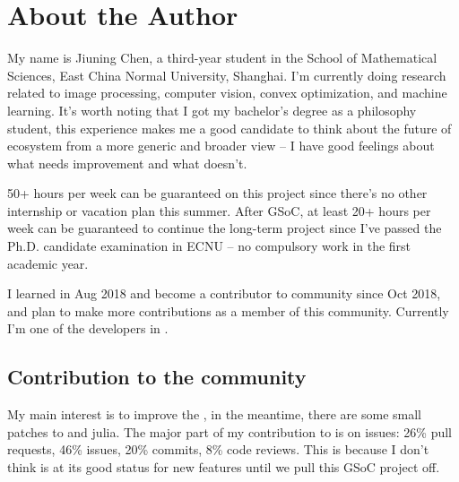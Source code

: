 
\section{About the Author}\label{sec:about_author}

My name is \textsf{Jiuning Chen}, a third-year student in the School of Mathematical Sciences, East China Normal University, Shanghai. I'm currently doing research related to image processing, computer vision, convex optimization, and machine learning. It's worth noting that I got my bachelor's degree as a philosophy student, this experience makes me a good candidate to think about the future of \images{} ecosystem from a more generic and broader view -- I have good feelings about what needs improvement and what doesn't.\par

50+ hours per week can be guaranteed on this project since there's no other internship or vacation plan this summer. After GSoC, at least 20+ hours per week can be guaranteed to continue the long-term \images{}  project since I've passed the Ph.D. candidate examination in ECNU -- no compulsory work in the first academic year. \par

I learned \langjulia in Aug 2018 and become a contributor to \langjulia community since Oct 2018, and plan to make more contributions as a member of this community. Currently I'm one of the developers in \repoimagesgithubio{}.

\subsection*{Contribution to the community}
My main interest is to improve the \images, in the meantime, there are some small patches to \flux{} and \textsf{julia}. The major part of my contribution to \textsf{\juliaimages} is on issues: 26\% pull requests, 46\% issues, 20\% commits, 8\% code reviews. This is because I don't think \images{} is at its good status for new features until we pull this GSoC project off.

